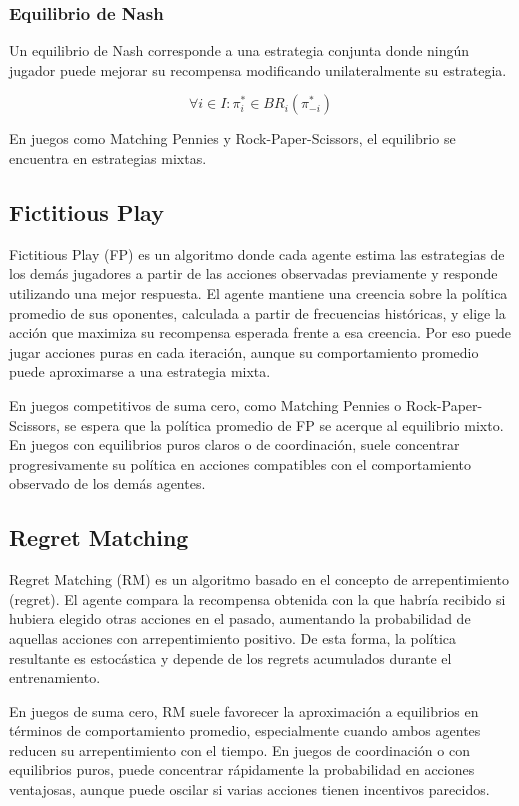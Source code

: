\documentclass[letterpaper,12pt]{article} %
\begin{document}
\subsubsection{Equilibrio de Nash}

Un equilibrio de Nash corresponde a una estrategia conjunta donde ningún jugador puede mejorar su recompensa modificando unilateralmente su estrategia.

\[
\forall i \in I : \pi_i^* \in BR_i(\pi_{-i}^*)
\]

En juegos como Matching Pennies y Rock-Paper-Scissors, el equilibrio se encuentra en estrategias mixtas.

\subsection{Fictitious Play}

Fictitious Play (FP) es un algoritmo donde cada agente estima las estrategias de los demás jugadores a partir de las acciones observadas previamente y responde utilizando una mejor respuesta. El agente mantiene una creencia sobre la política promedio de sus oponentes, calculada a partir de frecuencias históricas, y elige la acción que maximiza su recompensa esperada frente a esa creencia. Por eso puede jugar acciones puras en cada iteración, aunque su comportamiento promedio puede aproximarse a una estrategia mixta.

En juegos competitivos de suma cero, como Matching Pennies o Rock-Paper-Scissors, se espera que la política promedio de FP se acerque al equilibrio mixto. En juegos con equilibrios puros claros o de coordinación, suele concentrar progresivamente su política en acciones compatibles con el comportamiento observado de los demás agentes.

\subsection{Regret Matching}

Regret Matching (RM) es un algoritmo basado en el concepto de arrepentimiento (regret). El agente compara la recompensa obtenida con la que habría recibido si hubiera elegido otras acciones en el pasado, aumentando la probabilidad de aquellas acciones con arrepentimiento positivo. De esta forma, la política resultante es estocástica y depende de los regrets acumulados durante el entrenamiento.

En juegos de suma cero, RM suele favorecer la aproximación a equilibrios en términos de comportamiento promedio, especialmente cuando ambos agentes reducen su arrepentimiento con el tiempo. En juegos de coordinación o con equilibrios puros, puede concentrar rápidamente la probabilidad en acciones ventajosas, aunque puede oscilar si varias acciones tienen incentivos parecidos.
\end{document}
